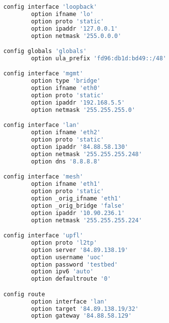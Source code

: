 \begin{lstlisting}[language=bash, caption={Network}]
config interface 'loopback'
        option ifname 'lo'
        option proto 'static'
        option ipaddr '127.0.0.1'
        option netmask '255.0.0.0'

config globals 'globals'
        option ula_prefix 'fd96:db1d:bd49::/48'

config interface 'mgmt'
        option type 'bridge'
        option ifname 'eth0'
        option proto 'static'
        option ipaddr '192.168.5.5'
        option netmask '255.255.255.0'

config interface 'lan'
        option ifname 'eth2'
        option proto 'static'
        option ipaddr '84.88.58.130'
        option netmask '255.255.255.248'
        option dns '8.8.8.8'

config interface 'mesh'
        option ifname 'eth1'
        option proto 'static'
        option _orig_ifname 'eth1'
        option _orig_bridge 'false'
        option ipaddr '10.90.236.1'
        option netmask '255.255.255.224'

config interface 'upfl'
        option proto 'l2tp'
        option server '84.89.138.19'
        option username 'uoc'
        option password 'testbed'
        option ipv6 'auto'
        option defaultroute '0'

config route
        option interface 'lan'
        option target '84.89.138.19/32'
        option gateway '84.88.58.129'
\end{lstlisting}
